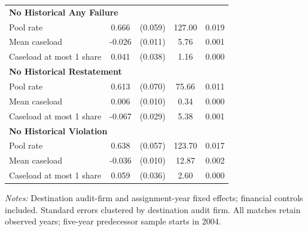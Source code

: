\begin{table}[htbp]
\begin{threeparttable}
\begin{tabular}{p{}cccc}
\multicolumn{5}{l}{\textbf{No Historical Any Failure}} \\
Pool rate & 0.666 & (0.059) & 127.00 & 0.019 \\
Mean caseload & -0.026 & (0.011) & 5.76 & 0.001 \\
Caseload at most 1 share & 0.041 & (0.038) & 1.16 & 0.000 \\
\multicolumn{5}{l}{\textbf{No Historical Restatement}} \\
Pool rate & 0.613 & (0.070) & 75.66 & 0.011 \\
Mean caseload & 0.006 & (0.010) & 0.34 & 0.000 \\
Caseload at most 1 share & -0.067 & (0.029) & 5.38 & 0.001 \\
\multicolumn{5}{l}{\textbf{No Historical Violation}} \\
Pool rate & 0.638 & (0.057) & 123.70 & 0.017 \\
Mean caseload & -0.036 & (0.010) & 12.87 & 0.002 \\
Caseload at most 1 share & 0.059 & (0.036) & 2.60 & 0.000 \\
\bottomrule
\end{tabular}
\begin{tablenotes}\footnotesize
\item \raggedright \textit{Notes:} Destination audit-firm and assignment-year fixed effects; financial controls included. Standard errors clustered by destination audit firm. All matches retain observed years; five-year predecessor sample starts in 2004.
\end{tablenotes}
\end{threeparttable}
\end{table}
